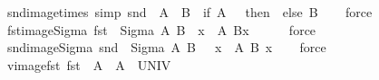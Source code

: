 \begin{isabellebody}
%
\isadelimproof
\isanewline
%
\endisadelimproof
\isanewline
{}\isamarkupfalse%
\ snd{\isacharunderscore}{\kern0pt}image{\isacharunderscore}{\kern0pt}times\ {\isacharbrackleft}{\kern0pt}simp{\isacharbrackright}{\kern0pt}{\isacharcolon}{\kern0pt}\ {\isachardoublequoteopen}snd\ {\isacharbackquote}{\kern0pt}\ {\isacharparenleft}{\kern0pt}A\ {\isasymtimes}\ B{\isacharparenright}{\kern0pt}\ {\isacharequal}{\kern0pt}\ {\isacharparenleft}{\kern0pt}if\ A\ {\isacharequal}{\kern0pt}\ {\isacharbraceleft}{\kern0pt}{\isacharbraceright}{\kern0pt}\ then\ {\isacharbraceleft}{\kern0pt}{\isacharbraceright}{\kern0pt}\ else\ B{\isacharparenright}{\kern0pt}{\isachardoublequoteclose}\isanewline
%
\isadelimproof
\ \ %
\endisadelimproof
%
\isatagproof
{}\isamarkupfalse%
\ force%
\endisatagproof
{\isafoldproof}%
%
\isadelimproof
\isanewline
%
\endisadelimproof
\isanewline
{}\isamarkupfalse%
\ fst{\isacharunderscore}{\kern0pt}image{\isacharunderscore}{\kern0pt}Sigma{\isacharcolon}{\kern0pt}\ {\isachardoublequoteopen}fst\ {\isacharbackquote}{\kern0pt}\ {\isacharparenleft}{\kern0pt}Sigma\ A\ B{\isacharparenright}{\kern0pt}\ {\isacharequal}{\kern0pt}\ {\isacharbraceleft}{\kern0pt}x\ {\isasymin}\ A{\isachardot}{\kern0pt}\ B{\isacharparenleft}{\kern0pt}x{\isacharparenright}{\kern0pt}\ {\isasymnoteq}\ {\isacharbraceleft}{\kern0pt}{\isacharbraceright}{\kern0pt}{\isacharbraceright}{\kern0pt}{\isachardoublequoteclose}\isanewline
%
\isadelimproof
\ \ %
\endisadelimproof
%
\isatagproof
{}\isamarkupfalse%
\ force%
\endisatagproof
{\isafoldproof}%
%
\isadelimproof
\isanewline
%
\endisadelimproof
\isanewline
{}\isamarkupfalse%
\ snd{\isacharunderscore}{\kern0pt}image{\isacharunderscore}{\kern0pt}Sigma{\isacharcolon}{\kern0pt}\ {\isachardoublequoteopen}snd\ {\isacharbackquote}{\kern0pt}\ {\isacharparenleft}{\kern0pt}Sigma\ A\ B{\isacharparenright}{\kern0pt}\ {\isacharequal}{\kern0pt}\ {\isacharparenleft}{\kern0pt}{\isasymUnion}\ x\ {\isasymin}\ A{\isachardot}{\kern0pt}\ B\ x{\isacharparenright}{\kern0pt}{\isachardoublequoteclose}\isanewline
%
\isadelimproof
\ \ %
\endisadelimproof
%
\isatagproof
{}\isamarkupfalse%
\ force%
\endisatagproof
{\isafoldproof}%
%
\isadelimproof
\isanewline
%
\endisadelimproof
\isanewline
{}\isamarkupfalse%
\ vimage{\isacharunderscore}{\kern0pt}fst{\isacharcolon}{\kern0pt}\ {\isachardoublequoteopen}fst\ {\isacharminus}{\kern0pt}{\isacharbackquote}{\kern0pt}\ A\ {\isacharequal}{\kern0pt}\ A\ {\isasymtimes}\ UNIV{\isachardoublequoteclose}\isanewline
%
\isadelimproof
\ \ %

\end{isabellebody}
